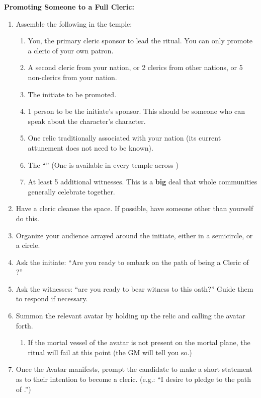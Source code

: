 \documentclass[green]{GL2020}
\begin{document}
\textbf{Promoting Someone to a Full Cleric:}
  \begin{enumerate}
    \item Assemble the following in the temple:
    \begin{enumerate}
      \item You, the primary cleric sponsor to lead the ritual. You can only promote a cleric of your own patron.
      \item A second cleric from your nation, or  2 clerics from other nations, or 5 non-clerics from your nation.
      \item The initiate to be promoted.
      \item 1 person to be the initiate’s sponsor. This should be someone who can speak about the character’s character.
      \item One relic traditionally associated with your nation (its current attunement does not need to be known).
      \item The ``\iOakStaff{}'' (One is available in every temple across \pEarth{})
      \item At least 5 additional witnesses. This is a \textbf{big} deal that whole communities generally celebrate together.
    \end{enumerate}
    \item Have a cleric cleanse the space. If possible, have someone other than yourself do this.
    \item Organize your audience arrayed around the initiate, either in a semicircle, or a circle.
    \item Ask the initiate: ``Are you ready to embark on the path of being a Cleric of \cTechGod{}?''
    \item Ask the witnesses: ``are you ready to bear witness to this oath?'' Guide them to respond if necessary.
    \item Summon the relevant avatar by holding up the relic and calling the avatar forth.
    \begin{enumerate}
      \item If the mortal vessel of the avatar is not present on the mortal plane, the ritual will fail at this point (the GM will tell you so.)
    \end{enumerate}
    \item Once the Avatar manifests, prompt the candidate to make a short statement as to their intention to become a cleric. (e.g.: ``I desire to pledge to the path of \cTechGod{}.'')
    \begin{enumerate}

\end{enumerate}
\end{enumerate}
\end{document}
